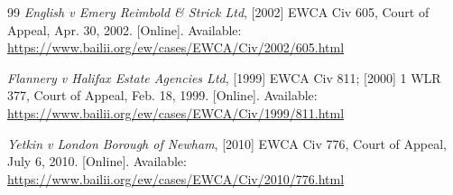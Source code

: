 \documentclass[conference]{IEEEtran}
\begin{document}
\begin{thebibliography}{99}
\textit{English v Emery Reimbold \& Strick Ltd}, [2002] EWCA Civ 605, Court of Appeal, Apr. 30, 2002. [Online]. Available: \url{https://www.bailii.org/ew/cases/EWCA/Civ/2002/605.html}

\textit{Flannery v Halifax Estate Agencies Ltd}, [1999] EWCA Civ 811; [2000] 1 WLR 377, Court of Appeal, Feb. 18, 1999. [Online]. Available: \url{https://www.bailii.org/ew/cases/EWCA/Civ/1999/811.html}

\textit{Yetkin v London Borough of Newham}, [2010] EWCA Civ 776, Court of Appeal, July 6, 2010. [Online]. Available: \url{https://www.bailii.org/ew/cases/EWCA/Civ/2010/776.html}

\end{thebibliography}
\end{document}
